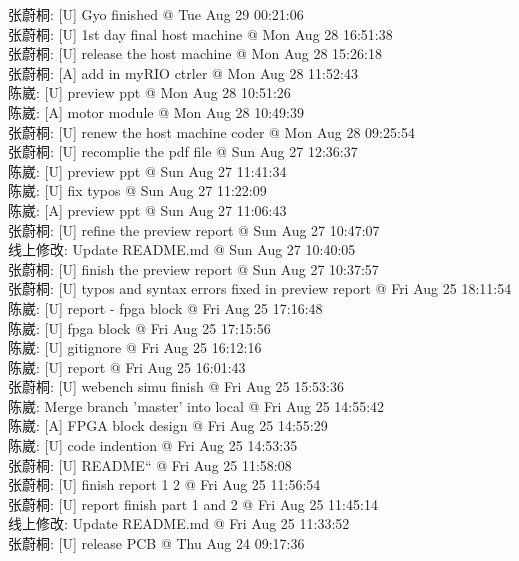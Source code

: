 \documentclass[a4paper]{paper}
\begin{document}
张蔚桐: [U] Gyo finished @ Tue Aug 29 00:21:06\\ 
张蔚桐: [U] 1st day final host machine @ Mon Aug 28 16:51:38\\ 
张蔚桐: [U] release the host machine @ Mon Aug 28 15:26:18\\ 
张蔚桐: [A] add in myRIO ctrler @ Mon Aug 28 11:52:43\\ 
陈崴: [U] preview ppt @ Mon Aug 28 10:51:26\\ 
陈崴: [A] motor module @ Mon Aug 28 10:49:39\\ 
张蔚桐: [U] renew the host machine coder @ Mon Aug 28 09:25:54\\ 
张蔚桐: [U] recomplie the pdf file @ Sun Aug 27 12:36:37\\ 
陈崴: [U] preview ppt @ Sun Aug 27 11:41:34\\ 
陈崴: [U] fix typos @ Sun Aug 27 11:22:09\\  
陈崴: [A] preview ppt @ Sun Aug 27 11:06:43\\  
张蔚桐: [U] refine the preview report @ Sun Aug 27 10:47:07\\ 
线上修改: Update README.md @ Sun Aug 27 10:40:05\\ 
张蔚桐: [U] finish the preview report @ Sun Aug 27 10:37:57\\ 
张蔚桐: [U] typos and syntax errors fixed in preview report @ Fri Aug 25 18:11:54\\ 
陈崴: [U] report - fpga block @ Fri Aug 25 17:16:48\\ 
陈崴: [U] fpga block @ Fri Aug 25 17:15:56\\ 
陈崴: [U] gitignore @ Fri Aug 25 16:12:16\\  
陈崴: [U] report @ Fri Aug 25 16:01:43\\ 
张蔚桐: [U] webench simu finish @ Fri Aug 25 15:53:36\\ 
陈崴: Merge branch 'master' into local @ Fri Aug 25 14:55:42\\ 
陈崴: [A] FPGA block design @ Fri Aug 25 14:55:29\\ 
陈崴: [U] code indention @ Fri Aug 25 14:53:35\\ 
张蔚桐: [U] README“ @ Fri Aug 25 11:58:08\\ 
张蔚桐: [U] finish report 1 2 @ Fri Aug 25 11:56:54\\ 
张蔚桐: [U] report finish part 1 and 2 @ Fri Aug 25 11:45:14\\ 
线上修改: Update README.md @ Fri Aug 25 11:33:52\\ 
张蔚桐: [U] release PCB @ Thu Aug 24 09:17:36\\ 
\end{document}
